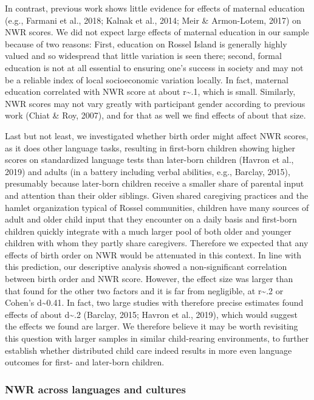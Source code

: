 \documentclass[english,,man,floatsintext]{apa6}
\begin{document}
In contrast, previous work shows little evidence for effects of maternal education (e.g., Farmani et al., 2018; Kalnak et al., 2014; Meir \& Armon-Lotem, 2017) on NWR scores. We did not expect large effects of maternal education in our sample because of two reasons: First, education on Rossel Island is generally highly valued and so widespread that little variation is seen there; second, formal education is not at all essential to ensuring one's success in society and may not be a reliable index of local socioeconomic variation locally. In fact, maternal education correlated with NWR score at about r\textasciitilde{}.1, which is small. Similarly, NWR scores may not vary greatly with participant gender according to previous work (Chiat \& Roy, 2007), and for that as well we find effects of about that size.

Last but not least, we investigated whether birth order might affect NWR scores, as it does other language tasks, resulting in first-born children showing higher scores on standardized language tests than later-born children (Havron et al., 2019) and adults (in a battery including verbal abilities, e.g., Barclay, 2015), presumably because later-born children receive a smaller share of parental input and attention than their older siblings. Given shared caregiving practices and the hamlet organization typical of Rossel communities, children have many sources of adult and older child input that they encounter on a daily basis and first-born children quickly integrate with a much larger pool of both older and younger children with whom they partly share caregivers. Therefore we expected that any effects of birth order on NWR would be attenuated in this context. In line with this prediction, our descriptive analysis showed a non-significant correlation between birth order and NWR score. However, the effect size was larger than that found for the other two factors and it is far from negligible, at r\textasciitilde{}.2 or Cohen's d\textasciitilde{}0.41. In fact, two large studies with therefore precise estimates found effects of about d\textasciitilde{}.2 (Barclay, 2015; Havron et al., 2019), which would suggest the effects we found are larger. We therefore believe it may be worth revisiting this question with larger samples in similar child-rearing environments, to further establish whether distributed child care indeed results in more even language outcomes for first- and later-born children.

\hypertarget{nwr-across-languages-and-cultures}{%
\subsubsection{NWR across languages and cultures}\label{nwr-across-languages-and-cultures}}
\end{document}
